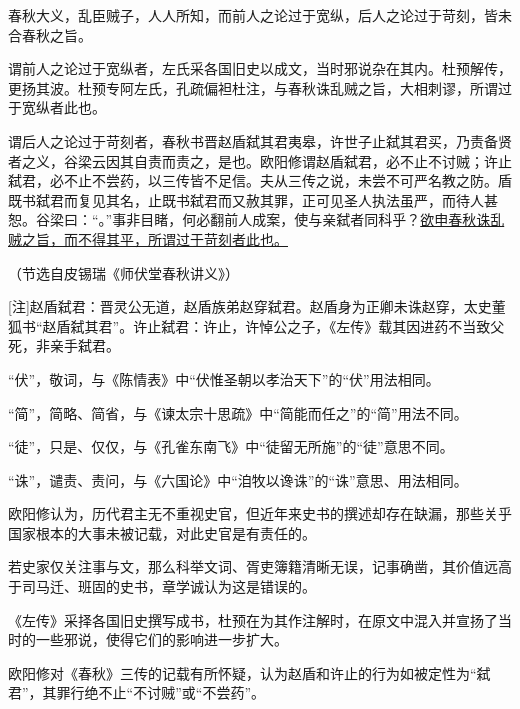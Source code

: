 \documentclass[11pt,a4paper]{ctexart}
\begin{document}
\begin{materialtext}
春秋大义，乱臣贼子，人人所知，而前人之论过于宽纵，后人之论过于苛刻，皆未合春秋之旨。

谓前人之论过于宽纵者，左氏采各国旧史以成文，当时邪说杂在其内。杜预解传，更扬其波。杜预专阿左氏，孔疏偏袒杜注，与春秋诛乱贼之旨，大相刺谬，所谓过于宽纵者此也。

谓后人之论过于苛刻者，春秋书晋赵盾弑其君夷皋，许世子止弑其君买，乃责备贤者之义，谷梁云因其自责而责之，是也。欧阳修谓赵盾弑君，必不止不讨贼；许止弑君，必不止不尝药，以三传皆不足信。夫从三传之说，未尝不可严名教之防。盾既书弑君而复见其名，止既书弑君而又赦其罪，正可见圣人执法虽严，而待人甚恕。谷梁曰：“。”事非目睹，何必翻前人成案，使与亲弑者同科乎？\uline{欲申春秋诛乱贼之旨，而不得其平，所谓过于苛刻者此也。}
\end{materialtext}
\begin{flushright}（节选自皮锡瑞《师伏堂春秋讲义》）\end{flushright}

[注]赵盾弑君：晋灵公无道，赵盾族弟赵穿弑君。赵盾身为正卿未诛赵穿，太史董狐书“赵盾弑其君”。许止弑君：许止，许悼公之子，《左传》载其因进药不当致父死，非亲手弑君。



\begin{choices}
\item “伏”，敬词，与《陈情表》中“伏惟圣朝以孝治天下”的“伏”用法相同。
\item “简”，简略、简省，与《谏太宗十思疏》中“简能而任之”的“简”用法不同。
\item “徒”，只是、仅仅，与《孔雀东南飞》中“徒留无所施”的“徒”意思不同。
\item “诛”，谴责、责问，与《六国论》中“洎牧以谗诛”的“诛”意思、用法相同。
\end{choices}

\begin{choices}
\item 欧阳修认为，历代君主无不重视史官，但近年来史书的撰述却存在缺漏，那些关乎国家根本的大事未被记载，对此史官是有责任的。
\item 若史家仅关注事与文，那么科举文词、胥吏簿籍清晰无误，记事确凿，其价值远高于司马迁、班固的史书，章学诚认为这是错误的。
\item 《左传》采择各国旧史撰写成书，杜预在为其作注解时，在原文中混入并宣扬了当时的一些邪说，使得它们的影响进一步扩大。
\item 欧阳修对《春秋》三传的记载有所怀疑，认为赵盾和许止的行为如被定性为“弑君”，其罪行绝不止“不讨贼”或“不尝药”。
\end{choices}
\end{document}
